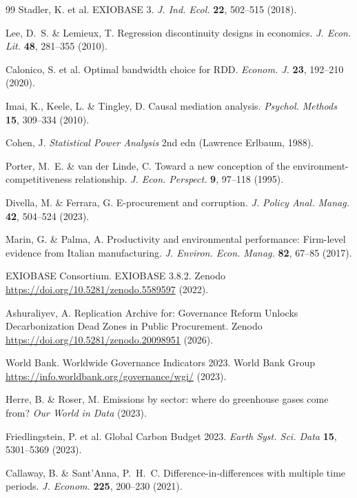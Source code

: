 \documentclass[11pt,a4paper]{article}
\begin{document}
\begin{thebibliography}{99}
Stadler, K. et al. EXIOBASE 3. \textit{J. Ind. Ecol.} \textbf{22}, 502--515 (2018).
 
Lee, D.~S. \& Lemieux, T. Regression discontinuity designs in economics. \textit{J. Econ. Lit.} \textbf{48}, 281--355 (2010).

Calonico, S. et al. Optimal bandwidth choice for RDD. \textit{Econom. J.} \textbf{23}, 192--210 (2020).

Imai, K., Keele, L. \& Tingley, D. Causal mediation analysis. \textit{Psychol. Methods} \textbf{15}, 309--334 (2010).

Cohen, J. \textit{Statistical Power Analysis} 2nd edn (Lawrence Erlbaum, 1988).

Porter, M.~E. \& van der Linde, C. Toward a new conception of the environment-competitiveness relationship. \textit{J. Econ. Perspect.} \textbf{9}, 97--118 (1995).

Divella, M. \& Ferrara, G. E-procurement and corruption. \textit{J. Policy Anal. Manag.} \textbf{42}, 504--524 (2023).

Marin, G. \& Palma, A. Productivity and environmental performance: Firm-level evidence from Italian manufacturing. \textit{J. Environ. Econ. Manag.} \textbf{82}, 67--85 (2017).

EXIOBASE Consortium. EXIOBASE 3.8.2. Zenodo \url{https://doi.org/10.5281/zenodo.5589597} (2022).

Ashuraliyev, A. Replication Archive for: Governance Reform Unlocks Decarbonization Dead Zones in Public Procurement. Zenodo \url{https://doi.org/10.5281/zenodo.20098951} (2026).

World Bank. Worldwide Governance Indicators 2023. World Bank Group \url{https://info.worldbank.org/governance/wgi/} (2023).

Herre, B. \& Roser, M. Emissions by sector: where do greenhouse gases come from? \textit{Our World in Data} (2023).

Friedlingstein, P. et al. Global Carbon Budget 2023. \textit{Earth Syst. Sci. Data} \textbf{15}, 5301--5369 (2023).

Callaway, B. \& Sant'Anna, P.~H.~C. Difference-in-differences with multiple time periods. \textit{J. Econom.} \textbf{225}, 200--230 (2021).


\end{thebibliography}
\end{document}

